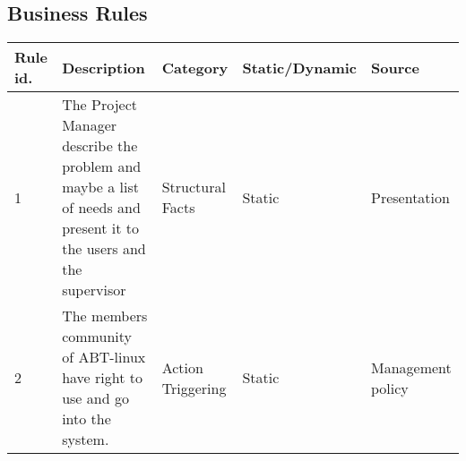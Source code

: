 \begin{sidewaystable}
\section{Business Rules}
\begin{center}
\begin{tabular*}{\linewidth}{|p{1cm}|p{9cm}|p{4.3cm}|p{2.5cm}|p{2cm}|}
	\hline
	\textbf{Rule id.} & \textbf{Description} & \textbf{Category} & \textbf{Static/Dynamic} & \textbf{Source} \\
	\hline
	1 & The Project Manager describe the problem and maybe a list of needs and present it to the users and the supervisor & Structural Facts & Static & Presentation \\
	\hline
	2 & The members community of ABT-linux have right to use and go into the system. & Action Triggering & Static & Management policy \\
	\hline
\end{tabular*}
\end{center}
\end{sidewaystable}